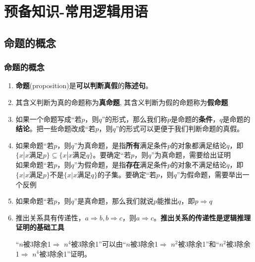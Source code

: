 \chapter*{预备知识-常用逻辑用语}
\section*{命题的概念}
\subsection*{命题的概念}
\begin{enumerate}
    \item \textbf{命题}(proposition)是\textbf{可以判断真假}的\textbf{陈述句}。
    \item 其含义判断为真的命题称为\textbf{真命题}, 其含义判断为假的命题称为\textbf{假命题}
        \begin{example}
        \end{example}
    \item 如果一个命题写成“若$p$，则$q$”的形式，那么我们称$p$是命题的\textbf{条件}，$q$是命题的\textbf{结论}。把一些命题改成“若$p$，则$q$”的形式可以更便于我们判断命题的真假。
    \item 如果命题“若$p$，则$q$”为真命题，是指\textbf{所有}满足条件$p$的对象都满足结论$q$，即$\{x | x \mbox{满足} p\} \subseteq \{x | x \mbox{满足} q\}$。要确定“若$p$，则$q$”为真命题，需要给出证明 \\
    如果命题“若$p$，则$q$”为假命题，是指\textbf{存在}满足条件$p$的对象不满足结论$q$，即$\{x | x \mbox{满足} p\} $不是$ \{x | x \mbox{满足} q\}$的子集。要确定“若$p$，则$q$”为假命题，需要举出一个反例
    \begin{example}
    \end{example}
    \item 如果命题“若$p$，则$q$”是真命题，那么我们就说$p$能推出$q$，即$p \Rightarrow q$
    \item 推出关系具有传递性，$a \Rightarrow b, b \Rightarrow c$，则$a \Rightarrow c$。\textbf{推出关系的传递性是逻辑推理证明的基础工具}
    \begin{example}
        “$n$被3除余1$\Rightarrow$ $n^4$被3除余1”可以由“$n$被3除余1$\Rightarrow$ $n^2$被3除余1”和“$n^2$被3除余1$\Rightarrow$ $n^4$被3除余1”证明。
    \end{example}
\end{enumerate}
